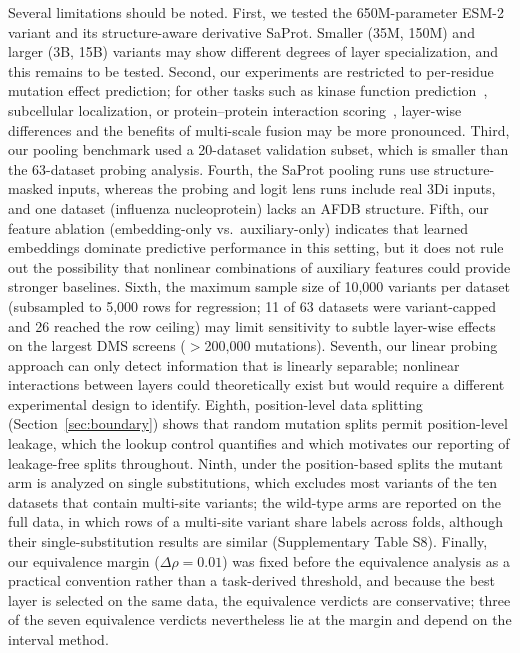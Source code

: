 \documentclass[numbered,webpdf,modern,large]{oup-authoring-template}
\newcommand{\rone}[1]{#1}
\newcommand{\rtwo}[1]{#1}
\newcommand{\rthree}[1]{#1}
\begin{document}
Several limitations should be noted. First, we tested the 650M-parameter
ESM-2 variant and its structure-aware derivative SaProt. Smaller (35M, 150M)
and larger (3B, 15B) variants may show different degrees of layer specialization,
and this remains to be tested. Second, our
experiments are restricted to per-residue mutation effect prediction; for other
tasks such as kinase function prediction~\cite{kumar2025}, subcellular
localization, or protein--protein interaction scoring~\cite{elshaffei2025},
layer-wise differences and the benefits of multi-scale fusion may be more
pronounced. Third, our pooling benchmark used a 20-dataset validation subset,
which is smaller than the \rone{63}-dataset probing analysis. \rone{Fourth,
the SaProt pooling runs use structure-masked inputs, whereas the probing and logit
lens runs include real 3Di inputs, and one dataset (influenza nucleoprotein) lacks
an AFDB structure. Fifth, our}
feature ablation (embedding-only vs.\ auxiliary-only) indicates that learned embeddings
dominate predictive performance in this setting, but it does
not rule out the possibility that nonlinear combinations of auxiliary features
could provide stronger baselines.
\rone{Sixth,} the
maximum sample size of 10,000 \rtwo{variants} per dataset (subsampled to 5,000
\rtwo{rows} for regression\rone{; \rtwo{11 of 63 datasets were variant-capped and 26
reached the row ceiling}}) may limit sensitivity to
subtle layer-wise effects on the largest DMS screens ($>$200,000 mutations). \rone{Seventh,} our linear probing approach can only detect
information that is linearly separable; nonlinear interactions between layers
could theoretically exist but would require a different experimental design to
identify. \rone{Eighth}, position-level data splitting (Section~\rtwo{\ref{sec:boundary}}) shows that
random mutation splits permit position-level leakage, \rone{which the lookup
control quantifies and which motivates our reporting of leakage-free splits
throughout}\rtwo{\rthree{. Ninth, under the position-based splits the mutant arm is analyzed on
single substitutions, which excludes most variants of the ten datasets that contain
multi-site variants; the wild-type arms are reported on the full data, in which rows of
a multi-site variant share labels across folds, although their single-substitution
results are similar (Supplementary Table S8)}. Finally, our
equivalence margin ($\Delta\rho = 0.01$) was fixed before the equivalence analysis as
a practical convention rather than a task-derived threshold, and because the best
layer is selected on the same data, the equivalence verdicts are conservative\rthree{;
three of the seven equivalence verdicts nevertheless lie at the margin and depend on
the interval method}.}
\end{document}
